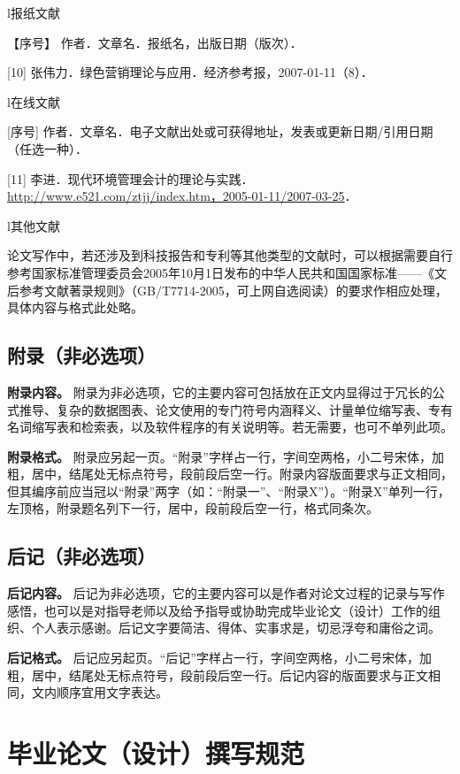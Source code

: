 \documentclass[singlesided]{Style/ucasthesis}%
\begin{document}
l报纸文献

【序号】 作者．文章名．报纸名，出版日期（版次）．

{[}10{]} 张伟力．绿色营销理论与应用．经济参考报，2007-01-11（8）．

l在线文献

{[}序号{]} 作者．文章名．电子文献出处或可获得地址，发表或更新日期/引用日期（任选一种）．

{[}11{]} 李进．现代环境管理会计的理论与实践．\url{http://www.e521.com/ztjj/index.htm，2005-01-11/2007-03-25}．

l其他文献

论文写作中，若还涉及到科技报告和专利等其他类型的文献时，可以根据需要自行参考国家标准管理委员会2005年10月1日发布的中华人民共和国国家标准------《文后参考文献著录规则》（GB/T7714-2005，可上网自选阅读）的要求作相应处理，具体内容与格式此处略。

\hypertarget{section-21}{%
\subsection{附录（非必选项）}\label{section-21}}

\textbf{附录内容。} 附录为非必选项，它的主要内容可包括放在正文内显得过于冗长的公式推导、复杂的数据图表、论文使用的专门符号内涵释义、计量单位缩写表、专有名词缩写表和检索表，以及软件程序的有关说明等。若无需要，也可不单列此项。

\textbf{附录格式。} 附录应另起一页。``附录''字样占一行，字间空两格，小二号宋体，加粗，居中，结尾处无标点符号，段前段后空一行。附录内容版面要求与正文相同，但其编序前应当冠以``附录''两字（如：``附录一''、``附录X''）。``附录X''单列一行，左顶格，附录题名列下一行，居中，段前段后空一行，格式同条次。

\hypertarget{section-22}{%
\subsection{后记（非必选项）}\label{section-22}}

\textbf{后记内容。} 后记为非必选项，它的主要内容可以是作者对论文过程的记录与写作感悟，也可以是对指导老师以及给予指导或协助完成毕业论文（设计）工作的组织、个人表示感谢。后记文字要简洁、得体、实事求是，切忌浮夸和庸俗之词。

\textbf{后记格式。} 后记应另起页。``后记''字样占一行，字间空两格，小二号宋体，加粗，居中，结尾处无标点符号，段前段后空一行。后记内容的版面要求与正文相同，文内顺序宜用文字表达。

\hypertarget{section-23}{%
\section{毕业论文（设计）撰写规范}\label{section-23}}
\end{document}
